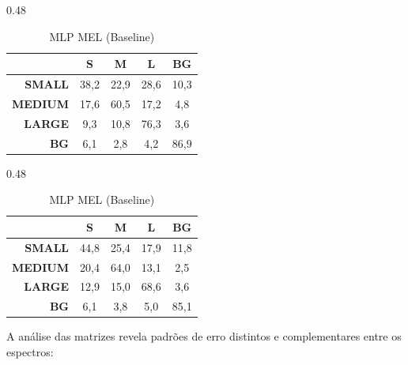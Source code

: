 \documentclass[a4paper,12pt]{article}
\begin{document}
\begin{table}[ht]
\vspace{0.3cm}
\begin{subtable}[t]{0.48\linewidth}
\centering
\caption{SVM LOFAR ($m$=6000, Proposto)}
\begin{tabular}{r|cccc}
       & \textbf{S} & \textbf{M} & \textbf{L} & \textbf{BG} \\ \hline
\textbf{SMALL}  & \cellcolor{hired}38,2 & 22,9 & \cellcolor{hired}28,6 & 10,3 \\
\textbf{MEDIUM} & 17,6 & \cellcolor{higreen}60,5 & 17,2 & 4,8 \\
\textbf{LARGE}  & 9,3 & 10,8 & \cellcolor{higreen}76,3 & 3,6 \\
\textbf{BG}     & 6,1 & 2,8 & 4,2 & \cellcolor{higreen}86,9 \\
\end{tabular}
\end{subtable}
\hfill
\begin{subtable}[t]{0.48\linewidth}
\centering
\caption{MLP MEL (Baseline)}
\begin{tabular}{r|cccc}
       & \textbf{S} & \textbf{M} & \textbf{L} & \textbf{BG} \\ \hline
\textbf{SMALL}  & \cellcolor{hiyellow}44,8 & \cellcolor{hired}25,4 & 17,9 & 11,8 \\
\textbf{MEDIUM} & 20,4 & \cellcolor{higreen}64,0 & 13,1 & 2,5 \\
\textbf{LARGE}  & 12,9 & 15,0 & \cellcolor{higreen}68,6 & 3,6 \\
\textbf{BG}     & 6,1 & 3,8 & 5,0 & \cellcolor{higreen}85,1 \\
\end{tabular}
\end{subtable}
\end{table}

A análise das matrizes revela padrões de erro distintos e complementares entre os espectros:
\end{document}
